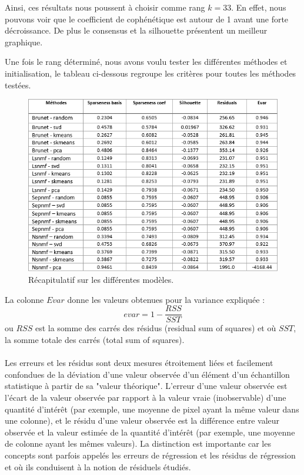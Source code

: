 \documentclass[runningheads]{llncs}
\begin{document}
Ainsi, ces résultats nous poussent à choisir comme rang $k = 33$. En effet, nous pouvons voir que le coefficient de cophénétique est autour de 1 avant une forte décroissance. De plus le consensus et la silhouette présentent un meilleur graphique. 

Une fois le rang déterminé, nous avons voulu tester les différentes méthodes et initialisation, le tableau ci-dessous regroupe les critères pour toutes les méthodes testées. 

\begin{figure}[H]
\centering
\includegraphics[width=1.0\textwidth]{tab-resultat.png}
\caption{Récapitulatif sur les différentes modèles.}
  \label{fig:tab-resultat}
\end{figure}

La colonne $Evar$ donne les valeurs obtenues pour la variance expliquée :
\begin{equation}
evar = 1 - \frac{RSS}{SST}
\end{equation}
ou $RSS$ est la somme des carrés des résidus (residual sum of squares) et où $SST$, la somme totale des carrés (total sum of squares). \\ \\
Les erreurs et les résidus sont deux mesures étroitement liées et facilement confondues de la déviation d'une valeur observée d'un élément d'un échantillon statistique à partir de sa "valeur théorique". L'erreur d'une valeur observée est l'écart de la valeur observée par rapport à la valeur vraie (inobservable) d'une quantité d'intérêt (par exemple, une moyenne de pixel ayant la même valeur dans une colonne), et le résidu d'une valeur observée est la différence entre valeur observée et la valeur estimée de la quantité d'intérêt (par exemple, une moyenne de colonne ayant les mêmes valeurs). La distinction est importante car les concepts sont parfois appelés les erreurs de régression et les résidus de régression et où ils conduisent à la notion de résiduels étudiés.
\end{document}
